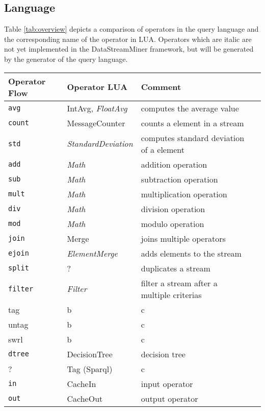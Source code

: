 \subsection{Language}
Table \ref{tab:overview} depicts a comparison of operators in the query language
and the corresponding name of the operator in LUA. Operators which are italic 
are not yet implemented in the DataStreamMiner framework, but will be generated
by the generator of the query language.
\begin{center}
  \begin{tabular}{|l|l|l|l|}
  \hline 
  \textbf{Operator Flow} &  \textbf{Operator LUA} &  \textbf{Comment} \\
  \hline 
  \hline 
  \texttt{avg} & IntAvg, \textit{FloatAvg} & computes the average value \\
  \hline 
  \texttt{count} & MessageCounter & counts a element in a stream \\
  \hline 
  \texttt{std} & \textit{StandardDeviation} & computes standard deviation of a element \\
  \hline 
  \texttt{add} & \textit{Math} & addition operation \\
  \hline 
  \texttt{sub} & \textit{Math} & subtraction operation \\
  \hline 
  \texttt{mult} & \textit{Math} & multiplication operation \\
  \hline 
  \texttt{div} & \textit{Math} & division operation \\
  \hline 
  \texttt{mod} & \textit{Math} & modulo operation \\
  \hline 
  \texttt{join} & Merge & joins multiple operators \\
  \hline 
  \texttt{ejoin} & \textit{ElementMerge} & adds elements to the stream \\
  \hline
  \texttt{split} & ? & duplicates a stream \\
  \hline
  \texttt{filter} & \textit{Filter} & filter a stream after a multiple criterias \\
  \hline
  tag & b & c \\
  \hline   
  untag & b & c \\
  \hline 
  swrl & b & c \\
  \hline
  \texttt{dtree} & DecisionTree & decision tree \\
  \hline  
  ? & Tag (Sparql) & c \\
  \hline 
  \texttt{in} & CacheIn & input operator \\
  \hline
  \texttt{out} & CacheOut & output operator \\

\end{tabular}
\end{center}
